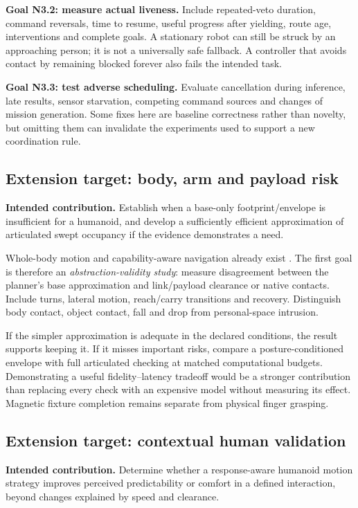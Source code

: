 \textbf{Goal N3.2: measure actual liveness.} Include repeated-veto duration,
command reversals, time to resume, useful progress after yielding, route age,
interventions and complete goals. A stationary robot can still be struck by an
approaching person; it is not a universally safe fallback. A controller that
avoids contact by remaining blocked forever also fails the intended task.

\textbf{Goal N3.3: test adverse scheduling.} Evaluate cancellation during
inference, late results, sensor starvation, competing command sources and changes
of mission generation. Some fixes here are baseline correctness rather than
novelty, but omitting them can invalidate the experiments used to support a new
coordination rule.

\subsection{Extension target: body, arm and payload risk}
\label{goal:body}
\textbf{Intended contribution.} Establish when a base-only footprint/envelope
is insufficient for a humanoid, and develop a sufficiently efficient approximation
of articulated swept occupancy if the evidence demonstrates a need.

Whole-body motion and capability-aware navigation already exist
\citep{expressive,asap,parkour,wheeledleg}. The first goal is therefore an
\emph{abstraction-validity study}: measure disagreement between the planner's
base approximation and link/payload clearance or native contacts. Include turns,
lateral motion, reach/carry transitions and recovery. Distinguish body contact,
object contact, fall and drop from personal-space intrusion.

If the simpler approximation is adequate in the declared conditions, the result
supports keeping it. If it misses important risks, compare a posture-conditioned
envelope with full articulated checking at matched computational budgets.
Demonstrating a useful fidelity--latency tradeoff would be a stronger contribution
than replacing every check with an expensive model without measuring its effect.
Magnetic fixture completion remains separate from physical finger grasping.

\subsection{Extension target: contextual human validation}
\label{goal:comfort}
\textbf{Intended contribution.} Determine whether a response-aware humanoid
motion strategy improves perceived predictability or comfort in a defined
interaction, beyond changes explained by speed and clearance.

